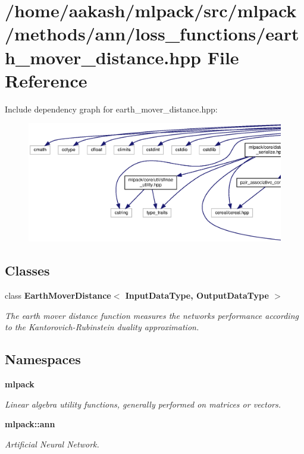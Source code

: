 \section{/home/aakash/mlpack/src/mlpack/methods/ann/loss\+\_\+functions/earth\+\_\+mover\+\_\+distance.hpp File Reference}
\label{earth__mover__distance_8hpp}
Include dependency graph for earth\+\_\+mover\+\_\+distance.\+hpp\+:
\nopagebreak
\begin{figure}[H]
\begin{center}
\leavevmode
\includegraphics[width=350pt]{earth__mover__distance_8hpp__incl}
\end{center}
\end{figure}
\subsection*{Classes}
\begin{DoxyCompactItemize}
\item 
class \textbf{ Earth\+Mover\+Distance$<$ Input\+Data\+Type, Output\+Data\+Type $>$}
\begin{DoxyCompactList}\small\item\em The earth mover distance function measures the network\textquotesingle{}s performance according to the Kantorovich-\/\+Rubinstein duality approximation. \end{DoxyCompactList}\end{DoxyCompactItemize}
\subsection*{Namespaces}
\begin{DoxyCompactItemize}
\item 
 \textbf{ mlpack}
\begin{DoxyCompactList}\small\item\em Linear algebra utility functions, generally performed on matrices or vectors. \end{DoxyCompactList}\item 
 \textbf{ mlpack\+::ann}
\begin{DoxyCompactList}\small\item\em Artificial Neural Network. \end{DoxyCompactList}\end{DoxyCompactItemize}


